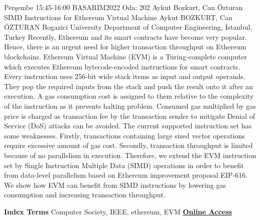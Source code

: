 
    \begin{abstract_basarim}
    {Perşembe 15:45-16:00}
    {BASARIM2022}
    {Oda: 202}
    {Aykut Bozkurt, Can Özturan}
    {SIMD Instructions for Ethereum Virtual Machine}
    {%
    Aykut BOZKURT, Can ÖZTURAN}
    {%
    }
    {%
    Bogazici University Department of Computer Engineering, Istanbul, Turkey}
    Recently, Ethereum and its smart contracts have become very popular. Hence, there is an urgent need for higher transaction throughput on Ethereum blockchains. Ethereum Virtual Machine (EVM) is a Turing-complete computer which executes Ethereum bytecode-encoded instructions for smart contracts. Every instruction uses 256-bit wide stack items as input and output operands. They pop the required inputs from the stack and push the result onto it after an execution. A gas consumption cost is assigned to them relative to the complexity of the instruction as it prevents halting problem. Consumed gas multiplied by gas price is charged as transaction fee by the transaction sender to mitigate Denial of Service (DoS) attacks can be avoided. The current supported instruction set has some weaknesses. Firstly, transactions containing large sized vector operations require excessive amount of gas cost. Secondly, transaction throughput is limited because of no parallelism in execution. Therefore, we extend the EVM instruction set by Single Instruction Multiple Data (SIMD) operations in order to benefit from data-level parallelism based on Ethereum improvement proposal EIP-616. We show how EVM can benefit from SIMD instructions by lowering gas consumption and increasing transaction throughput. 
    
            \textbf{Index Terms} \newline{}Computer Society, IEEE, ethereum, EVM
     \newline\newline\noindent \href{https://drive.google.com/file/d/1G21ovwck5gjelHhO2W6Vf2vnm9mGLyge/view?usp=drivesdk}{\bfseries Online Access}
    \end{abstract_basarim}
    
